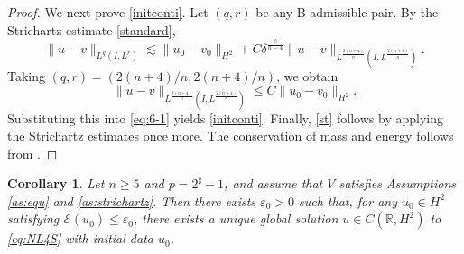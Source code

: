 \documentclass[11pt,a4paper]{article}
\numberwithin{equation}{section}
\newtheorem{corollary}[theorem]{Corollary}
\begin{document}
\begin{proof}
We next prove \eqref{initconti}. Let $(q, r)$ be any B-admissible pair. By the Strichartz estimate \eqref{standard},
\begin{equation}\label{eq:6-1}
\|u - v\|_{L^{q}(I, L^{r})} \lesssim \|u_{0} - v_{0}\|_{H^{2}} + C\delta^{\frac{8}{n-4}}\|u - v\|_{L^{\frac{2(n + 4)}{n}}(I, L^{\frac{2(n + 4)}{n}})}.
\end{equation}
Taking $(q, r) = \left(2(n+4)/n, 2(n+4)/n\right)$, we obtain
\[
\|u - v\|_{L^{\frac{2(n + 4)}{n}}(I, L^{\frac{2(n + 4)}{n}})} \leq C\|u_{0} - v_{0}\|_{H^{2}}.
\]
Substituting this into \eqref{eq:6-1} yields \eqref{initconti}.
Finally, \eqref{st} follows by applying the Strichartz estimates once more.
The conservation of mass and energy follows from \cite{Caz}.
\end{proof}

\begin{corollary}\label{global solution for small energy}
Let $n \geq 5$ and $p = 2^{\sharp} - 1$, and assume that $V$ satisfies Assumptions \ref{as:equ} and \ref{as:strichartz}. Then there exists $\varepsilon_{0} > 0$ such that, for any $u_{0} \in H^{2}$ satisfying $\mathcal{E}(u_{0}) \leq \varepsilon_{0}$, there exists a unique global solution $u\in C(\mathbb{R}, H^{2})$ to \eqref{eq:NL4S} with initial data $u_{0}$.
\end{corollary}
\end{document}
